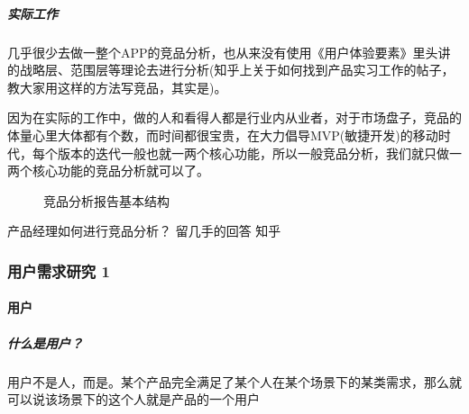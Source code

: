 \documentclass[letterpaper,11pt,english]{sphinxmanual}
\begin{document}
\subparagraph{实际工作}
\label{\detokenize{chapter_knowledge/goods_analysis:id31}}
几乎很少去做一整个APP的竞品分析，也从来没有使用《用户体验要素》里头讲的战略层、范围层等理论去进行分析(知乎上关于如何找到产品实习工作的帖子，教大家用这样的方法写竞品，其实是)。

因为在实际的工作中，做的人和看得人都是行业内从业者，对于市场盘子，竞品的体量心里大体都有个数，而时间都很宝贵，在大力倡导MVP(敏捷开发)的移动时代，每个版本的迭代一般也就一两个核心功能，所以一般竞品分析，我们就只做一两个核心功能的竞品分析就可以了。%
\begin{footnote}[462]\sphinxAtStartFootnote
{}
%
\end{footnote}

\begin{figure}[H]
\centering
\capstart

\noindent{}
\caption{竞品分析报告基本结构}\label{\detokenize{chapter_knowledge/goods_analysis:id35}}\end{figure}

产品经理如何进行竞品分析？ \sphinxhyphen{} 留几手的回答 \sphinxhyphen{} 知乎


\subsubsection{用户需求研究 1\sphinxfootnotemark[463]}
\label{\detokenize{chapter_knowledge/users_analysis:users-analysis}}\label{\detokenize{chapter_knowledge/users_analysis:id1}}\label{\detokenize{chapter_knowledge/users_analysis::doc}}%
\begin{footnotetext}[463]\sphinxAtStartFootnote
{}
%
\end{footnotetext}\ignorespaces 

\paragraph{用户}
\label{\detokenize{chapter_knowledge/users_analysis:id2}}

\subparagraph{什么是用户？}
\label{\detokenize{chapter_knowledge/users_analysis:id3}}
用户不是人，而是。某个产品完全满足了某个人在某个场景下的某类需求，那么就可以说该场景下的这个人就是产品的一个用户
\end{document}

